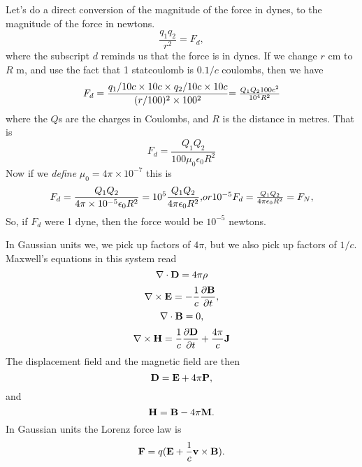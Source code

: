 Let's do a direct conversion of the magnitude of the force in dynes, to the magnitude of the force in newtons.
\begin{equation}
\frac{q_1 q_2}{ r^2 }=F_d,
\end{equation}
where the subscript $d$ reminds us that the force is in dynes.
If we change $r$ cm to $R$ m, and use the fact that 1 statcoulomb
is $0.1/c$ coulombs, then we have
\begin{equation}
F_d= 
  \frac {  q_1/10 c \times 10 c \times q_2/10 c \times 10 c }
  {   (r / 100)^2 \times {100^2} }
$$   $$
  =\frac {  Q_1 Q_2 100 c^2 }
  { 10^4 R^2}
\end{equation}
where the $Q$s are the charges in Coulombs, and $R$ is the distance in metres.
That is 
\begin{equation}
F_d= 
  \frac {  Q_1 Q_2  }
  { 100 \mu_0 \epsilon_0 R^2 }
\end{equation}
 Now if we {\it define}
$\mu_0= 4 \pi \times 10^{-7}$ this is
\begin{equation}
F_d = \frac{ Q_1 Q_2}{ 4  \pi \times 10^{-5} \epsilon_0 R^2}
   = 10^{5} \frac{ Q_1 Q_2}{ 4  \pi \epsilon_0 R^2},
$$ or  $$ 
10^{-5} F_d  
   =  \frac{ Q_1 Q_2}{ 4  \pi \epsilon_0 R^2}=F_N,
\end{equation}
So, if $F_d$ were 1 dyne, then the force would be $10^{-5}$ newtons.




In Gaussian  units we, we pick up factors of $4 \pi$, but we also 
pick up factors of $1/c$. Maxwell's equations in this system  read
\begin{equation}
 \nabla \cdot {\bf D}= 4 \pi {\rho}
\end{equation}
\begin{equation}
\nabla \times {\bf E}=- \frac{1}{c} \frac{\partial {\bf B}}{\partial t},
\end{equation}
\begin{equation}
 \nabla \cdot {\bf B}=0,
\end{equation}
\begin{equation}
\nabla \times {\bf H}= 
\frac{1}{c} \frac{\partial {\bf D}}{\partial t} +
\frac{ 4 \pi}{c} {\bf J}
\end{equation}
The displacement field and the magnetic  field are then
\begin{equation}
{\bf D}={\bf E}+4 \pi {\bf P},
\end{equation}
and
\begin{equation}
{\bf H}={\bf B}-4 \pi {\bf M}.
\end{equation}
In Gaussian units the Lorenz force law is
\begin{equation}
{\bf F}=q ( {\bf E} + \frac{1}{c} {\bf v} \times {\bf B}).
\end{equation}

